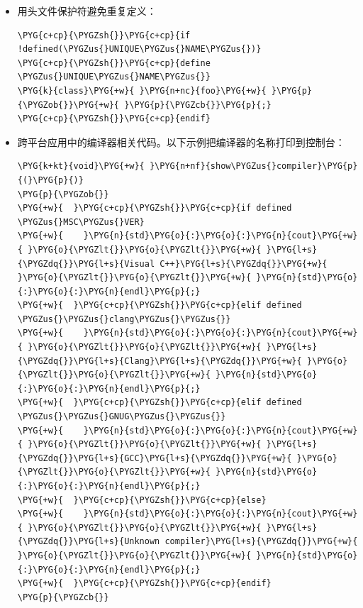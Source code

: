 \begin{itemize}
\item 用头文件保护符避免重复定义：



\begin{codeblockbg}
\begin{Verbatim}[commandchars=\\\{\},breaklines=true,breakanywhere=true,fontsize=\codefont,xleftmargin=17bp]
\PYG{c+cp}{\PYGZsh{}}\PYG{c+cp}{if !defined(\PYGZus{}UNIQUE\PYGZus{}NAME\PYGZus{})}
\PYG{c+cp}{\PYGZsh{}}\PYG{c+cp}{define \PYGZus{}UNIQUE\PYGZus{}NAME\PYGZus{}}
\PYG{k}{class}\PYG{+w}{ }\PYG{n+nc}{foo}\PYG{+w}{ }\PYG{p}{\PYGZob{}}\PYG{+w}{ }\PYG{p}{\PYGZcb{}}\PYG{p}{;}
\PYG{c+cp}{\PYGZsh{}}\PYG{c+cp}{endif}
\end{Verbatim}
\end{codeblockbg}



\item 跨平台应用中的编译器相关代码。以下示例把编译器的名称打印到控制台：



\begin{codeblockbg}
\begin{Verbatim}[commandchars=\\\{\},breaklines=true,breakanywhere=true,fontsize=\codefont,xleftmargin=17bp]
\PYG{k+kt}{void}\PYG{+w}{ }\PYG{n+nf}{show\PYGZus{}compiler}\PYG{p}{(}\PYG{p}{)}
\PYG{p}{\PYGZob{}}
\PYG{+w}{  }\PYG{c+cp}{\PYGZsh{}}\PYG{c+cp}{if defined \PYGZus{}MSC\PYGZus{}VER}
\PYG{+w}{    }\PYG{n}{std}\PYG{o}{:}\PYG{o}{:}\PYG{n}{cout}\PYG{+w}{ }\PYG{o}{\PYGZlt{}}\PYG{o}{\PYGZlt{}}\PYG{+w}{ }\PYG{l+s}{\PYGZdq{}}\PYG{l+s}{Visual C++}\PYG{l+s}{\PYGZdq{}}\PYG{+w}{ }\PYG{o}{\PYGZlt{}}\PYG{o}{\PYGZlt{}}\PYG{+w}{ }\PYG{n}{std}\PYG{o}{:}\PYG{o}{:}\PYG{n}{endl}\PYG{p}{;}
\PYG{+w}{  }\PYG{c+cp}{\PYGZsh{}}\PYG{c+cp}{elif defined \PYGZus{}\PYGZus{}clang\PYGZus{}\PYGZus{}}
\PYG{+w}{    }\PYG{n}{std}\PYG{o}{:}\PYG{o}{:}\PYG{n}{cout}\PYG{+w}{ }\PYG{o}{\PYGZlt{}}\PYG{o}{\PYGZlt{}}\PYG{+w}{ }\PYG{l+s}{\PYGZdq{}}\PYG{l+s}{Clang}\PYG{l+s}{\PYGZdq{}}\PYG{+w}{ }\PYG{o}{\PYGZlt{}}\PYG{o}{\PYGZlt{}}\PYG{+w}{ }\PYG{n}{std}\PYG{o}{:}\PYG{o}{:}\PYG{n}{endl}\PYG{p}{;}
\PYG{+w}{  }\PYG{c+cp}{\PYGZsh{}}\PYG{c+cp}{elif defined \PYGZus{}\PYGZus{}GNUG\PYGZus{}\PYGZus{}}
\PYG{+w}{    }\PYG{n}{std}\PYG{o}{:}\PYG{o}{:}\PYG{n}{cout}\PYG{+w}{ }\PYG{o}{\PYGZlt{}}\PYG{o}{\PYGZlt{}}\PYG{+w}{ }\PYG{l+s}{\PYGZdq{}}\PYG{l+s}{GCC}\PYG{l+s}{\PYGZdq{}}\PYG{+w}{ }\PYG{o}{\PYGZlt{}}\PYG{o}{\PYGZlt{}}\PYG{+w}{ }\PYG{n}{std}\PYG{o}{:}\PYG{o}{:}\PYG{n}{endl}\PYG{p}{;}
\PYG{+w}{  }\PYG{c+cp}{\PYGZsh{}}\PYG{c+cp}{else}
\PYG{+w}{    }\PYG{n}{std}\PYG{o}{:}\PYG{o}{:}\PYG{n}{cout}\PYG{+w}{ }\PYG{o}{\PYGZlt{}}\PYG{o}{\PYGZlt{}}\PYG{+w}{ }\PYG{l+s}{\PYGZdq{}}\PYG{l+s}{Unknown compiler}\PYG{l+s}{\PYGZdq{}}\PYG{+w}{ }\PYG{o}{\PYGZlt{}}\PYG{o}{\PYGZlt{}}\PYG{+w}{ }\PYG{n}{std}\PYG{o}{:}\PYG{o}{:}\PYG{n}{endl}\PYG{p}{;}
\PYG{+w}{  }\PYG{c+cp}{\PYGZsh{}}\PYG{c+cp}{endif}
\PYG{p}{\PYGZcb{}}
\end{Verbatim}
\end{codeblockbg}



\end{itemize}
